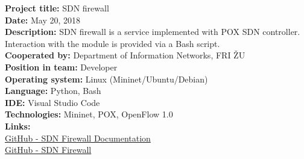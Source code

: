\documentclass[slovak]{article}
\begin{document}
\noindent
\textbf{Project title:} SDN firewall\\
\textbf{Date:} May 20, 2018\\
\textbf{Description:} SDN firewall is a service implemented with POX SDN controller. Interaction with the module is provided via a Bash script.\\
\textbf{Cooperated by:} Department of Information Networks, FRI ŽU\\
\textbf{Position in team:} Developer\\
\textbf{Operating system:} Linux (Mininet/Ubuntu/Debian)\\
\textbf{Language:} Python, Bash\\
\textbf{IDE:} Visual Studio Code\\
\textbf{Technologies:} Mininet, POX, OpenFlow 1.0\\
\textbf{Links:}\\
\href{https://github.com/kyberdrb/FRI/tree/master/Ing/4.semester/Integracia\_Sieti/semestralka}{GitHub - SDN Firewall Documentation}\\
\href{https://github.com/kyberdrb/sdnfirewall}{GitHub - SDN Firewall}
\end{document}
